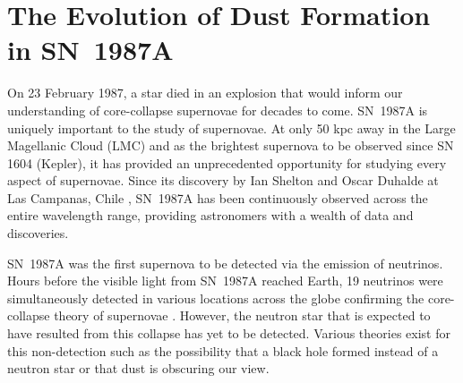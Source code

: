 \chapter{The Evolution of Dust Formation in SN~1987A}\label{chp:chp5}

%




On 23 February 1987, a star died in an explosion that would inform our understanding of core-collapse supernovae for decades to come.  SN~1987A is uniquely important to the study of supernovae.  At only 50 kpc away in the Large Magellanic Cloud (LMC) and as the brightest supernova to be observed since SN 1604 (Kepler), it has provided an unprecedented opportunity for studying every aspect of supernovae.  Since its discovery by Ian Shelton and Oscar Duhalde at Las Campanas, Chile \citep{Kunkel1987}, SN~1987A has been continuously observed across the entire wavelength range, providing astronomers with a wealth of data and discoveries.  

SN~1987A was the first supernova to be detected via the emission of neutrinos.  Hours before the visible light from SN~1987A reached Earth, 19 neutrinos were simultaneously detected in various locations across the globe confirming the core-collapse theory of supernovae \citep{Bionta1987,Hirata1987}.  However, the neutron star that is expected to have resulted from this collapse has yet to be detected.  Various theories exist for this non-detection such as the possibility that a black hole formed instead of a neutron star or that dust is obscuring our view.

